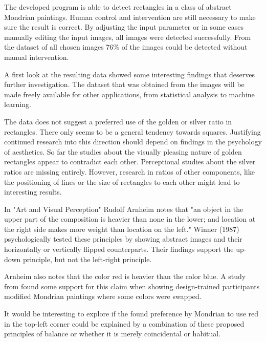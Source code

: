 \documentclass[serif,article,noparskip]{agse-thesis}
\begin{document}
The developed program is able to detect rectangles in a class of abstract
Mondrian paintings. Human control and intervention are still necessary to make
sure the result is correct. By adjusting the input parameter or in some cases
manually editing the input images, all images were detected successfully. From
the dataset of all chosen images 76\% of the images could be detected without
manual intervention.

A first look at the resulting data showed some interesting findings that deserves
further investigation. The dataset that was obtained from the images will be made
freely available for other applications, from statistical analysis to machine
learning.

The data does not suggest a preferred use of the golden or silver ratio in
rectangles. There only seems to be a general tendency towards squares.
Justifying continued research into this direction should depend on findings in
the psychology of aesthetics. So far the studies about the visually pleasing
nature of golden rectangles appear to contradict each other. Perceptional
studies about the silver ratios are missing entirely. However, research in  ratios
of other components, like the positioning of lines or the size of rectangles to
each other might lead to interesting results.

In "Art and Visual Perception" Rudolf Arnheim \cite{Arnheim1965} notes that "an
object in the upper part of the composition is heavier than none in the lower;
and location at the right side makes more weight than location on the left."
Winner (1987) \cite{Winner1987} psychologically tested these principles by
showing abstract images and their horizontally or vertically flipped
counterparts. Their findings support the up-down principle, but not the
left-right principle.

Arnheim also notes that the color red is heavier than the color blue. A study
from \cite{Locher2005} found some support for this claim when showing
design-trained participants modified Mondrian paintings where some colors were
swapped.

It would be interesting to explore if the found preference by Mondrian to use
red in the top-left corner could be explained by a combination of these proposed
principles of balance or whether it is merely coincidental or habitual.








% 
\end{document}

